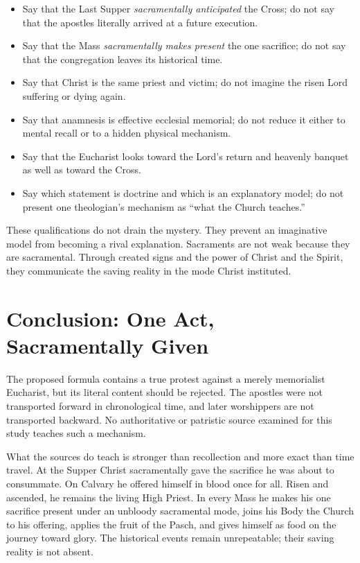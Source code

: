 \begin{deepstudy}
\begin{itemize}
  \item Say that the Last Supper \emph{sacramentally anticipated} the Cross;
  do not say that the apostles literally arrived at a future execution.
  \item Say that the Mass \emph{sacramentally makes present} the one sacrifice;
  do not say that the congregation leaves its historical time.
  \item Say that Christ is the same priest and victim; do not imagine the
  risen Lord suffering or dying again.
  \item Say that anamnesis is effective ecclesial memorial; do not reduce it
  either to mental recall or to a hidden physical mechanism.
  \item Say that the Eucharist looks toward the Lord's return and heavenly
  banquet as well as toward the Cross.
  \item Say which statement is doctrine and which is an explanatory model;
  do not present one theologian's mechanism as ``what the Church teaches.''
\end{itemize}

These qualifications do not drain the mystery. They prevent an imaginative
model from becoming a rival explanation. Sacraments are not weak because they
are sacramental. Through created signs and the power of Christ and the Spirit,
they communicate the saving reality in the mode Christ instituted.

\section{Conclusion: One Act, Sacramentally Given}

The proposed formula contains a true protest against a merely memorialist
Eucharist, but its literal content should be rejected. The apostles were not
transported forward in chronological time, and later worshippers are not
transported backward. No authoritative or patristic source examined for this
study teaches such a mechanism.

What the sources do teach is stronger than recollection and more exact than
time travel. At the Supper Christ sacramentally gave the sacrifice he was about
to consummate. On Calvary he offered himself in blood once for all. Risen and
ascended, he remains the living High Priest. In every Mass he makes his one
sacrifice present under an unbloody sacramental mode, joins his Body the Church
to his offering, applies the fruit of the Pasch, and gives himself as food on
the journey toward glory. The historical events remain unrepeatable; their
saving reality is not absent.


\end{deepstudy}
